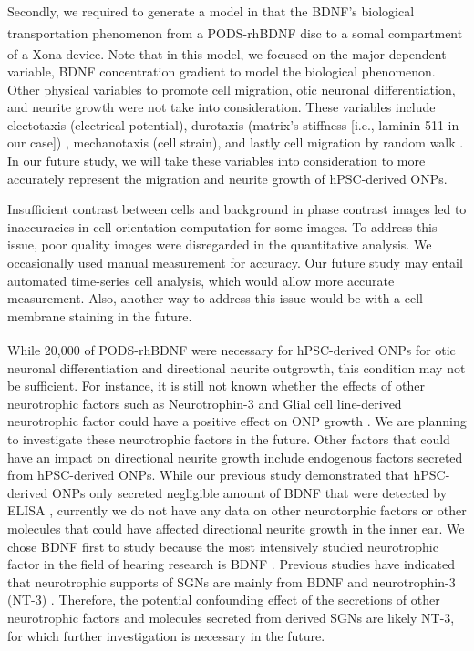 \documentclass[review]{elsarticle}
\begin{document}
\indent Secondly, we required to generate a model in that the BDNF's biological transportation phenomenon from a PODS\textsuperscript{\textregistered}-rhBDNF disc to a somal compartment of a Xona\textsuperscript{\texttrademark} device. Note that in this model, we focused on the major dependent variable, BDNF concentration gradient to model the biological phenomenon. Other physical variables to promote cell migration, otic neuronal differentiation, and neurite growth were not take into consideration. These variables include electotaxis (electrical potential), durotaxis (matrix's stiffness [i.e., laminin 511 in our case]) \cite{Gentile2016}, mechanotaxis (cell strain), and lastly cell migration by random walk \cite{berg1983}. In our future study, we will take these variables into consideration to more accurately represent the migration and neurite growth of hPSC-derived ONPs. 

\indent Insufficient contrast between cells and background in phase contrast images led to inaccuracies in cell orientation computation for some images. To address this issue, poor quality images were disregarded in the quantitative analysis. We occasionally used manual measurement for accuracy. Our future study may entail automated time-series cell analysis, which would allow more accurate measurement. Also, another way to address this issue would be with a cell membrane staining in the future. 

\indent While 20,000 of PODS\textsuperscript{\textregistered}-rhBDNF were necessary for hPSC-derived ONPs for otic neuronal differentiation and directional neurite outgrowth, this condition may not be sufficient. For instance, it is still not known whether the effects of other neurotrophic factors such as Neurotrophin-3 and Glial cell line-derived neurotrophic factor could have a positive effect on ONP growth \cite{green2012, li2017, Schulze2020}. We are planning to investigate these neurotrophic factors in the future. Other factors that could have an impact on directional neurite growth include endogenous factors secreted from hPSC-derived ONPs. While our previous study demonstrated that hPSC-derived ONPs only secreted negligible amount of BDNF that were detected by ELISA \cite{Chang2020}, currently we do not have any data on other neurotorphic factors or other molecules that could have affected directional neurite growth in the inner ear. We chose BDNF first to study because the most intensively studied neurotrophic factor in the field of hearing research is BDNF \cite{green2012}. Previous studies have indicated that neurotrophic supports of SGNs are mainly from BDNF and neurotrophin-3 (NT-3) \cite{green2012,Sasi2017}. Therefore, the potential confounding effect of the secretions of other neurotrophic factors and molecules secreted from derived SGNs are likely NT-3, for which further investigation is necessary in the future.  
\end{document}

